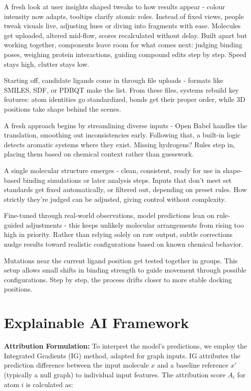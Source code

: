 \documentclass[conference]{IEEEtran}
\begin{document}
A fresh look at user insights shaped tweaks to how results appear - colour intensity now adapts, tooltips clarify atomic roles. Instead of fixed views, people tweak visuals live, adjusting hues or diving into fragments with ease. Molecules get uploaded, altered mid-flow, scores recalculated without delay. Built apart but working together, components leave room for what comes next: judging binding poses, weighing protein interactions, guiding compound edits step by step. Speed stays high, clutter stays low.

Starting off, candidate ligands come in through file uploads - formats like SMILES, SDF, or PDBQT make the list. From these files, systems rebuild key features: atom identities go standardized, bonds get their proper order, while 3D positions take shape behind the scenes.

A fresh approach begins by streamlining diverse inputs - Open Babel handles the translation, smoothing out inconsistencies early. Following that, a built-in logic detects aromatic systems where they exist. Missing hydrogens? Rules step in, placing them based on chemical context rather than guesswork.

A single molecular structure emerges - clean, consistent, ready for use in shape-based binding simulations or later analysis steps. Inputs that don't meet set standards get fixed automatically, or filtered out, depending on preset rules. How strictly they’re judged can be adjusted, giving control without complexity.

Fine-tuned through real-world observations, model predictions lean on rule-guided adjustments - this keeps unlikely molecular arrangements from rising too high in priority. Rather than relying solely on raw output, subtle corrections nudge results toward realistic configurations based on known chemical behavior.

Mutations near the current ligand position get tested together in groups. This setup allows small shifts in binding strength to guide movement through possible configurations. Step by step, the process drifts closer to more stable docking positions.

\section{Explainable AI Framework}

\noindent
\textbf{Attribution Formulation:}
To interpret the model's predictions, we employ the Integrated Gradients (IG) method, adapted for graph inputs. IG attributes the prediction difference between the input molecule $x$ and a baseline reference $x'$ (typically a null graph) to individual input features. The attribution score $A_i$ for atom $i$ is calculated as:
\end{document}
